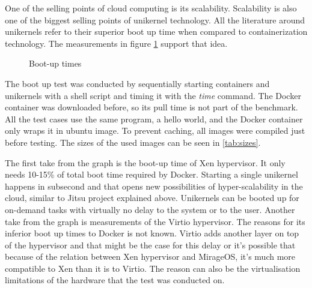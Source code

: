 One of the selling points of cloud computing is its scalability. Scalability is also one of the biggest selling points of unikernel technology. All the literature around unikernels refer to their superior boot up time when compared to containerization technology. The measurements in figure \ref{fig:boot-up} support that idea.
\begin{figure}[htpb]
  \centering
    \caption{Boot-up times}\label{fig:boot-up}
  \end{figure}

The boot up test was conducted by sequentially starting containers and unikernels with a shell script and timing it with the \textit{time} command. The Docker container was downloaded before, so its pull time is not part of the benchmark. All the test cases use the same program, a hello world, and the Docker container only wraps it in ubuntu image. To prevent caching, all images were compiled just before testing. The sizes of the used images can be seen in \ref{tab:sizes}.

The first take from the graph is the boot-up time of Xen hypervisor. It only needs 10-15\% of total boot time required by Docker. Starting a single unikernel happens in subsecond and that opens new possibilities of hyper-scalability in the cloud, similar to Jitsu project explained above. Unikernels can be booted up for on-demand tasks with virtually no delay to the system or to the user. Another take from the graph is measurements of the Virtio \cite{virtio} hypervisor. The reasons for its inferior boot up times to Docker is not known. Virtio adds another layer on top of the hypervisor and that might be the case for this delay or it's possible that because of the relation between Xen hypervisor and MirageOS, it's much more compatible to Xen than it is to Virtio. The reason can also be the virtualisation limitations of the hardware that the test was conducted on.


